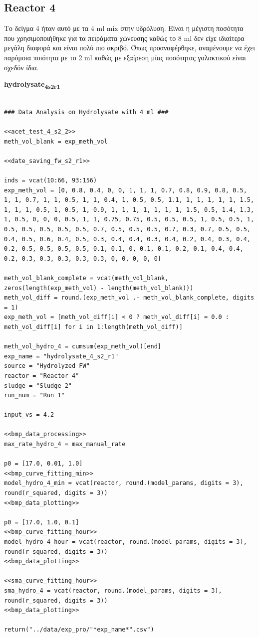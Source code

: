 \documentclass[11pt]{article}
\begin{document}
\subsection{Reactor 4}
\label{sec:org1684de5}
Το δείγμα 4 ήταν αυτό με τα 4 ml mix στην υδρόλυση. Είναι η μέγιστη ποσότητα που χρησιμοποιήθηκε για τα πειράματα χώνευσης καθώς το 8 ml δεν είχε ιδιαίτερα μεγάλη διαφορά και είναι πολύ πιο ακριβό. Όπως προαναφέρθηκε, αναμένουμε να έχει παρόμοια ποιότητα με το 2 ml καθώς με εξαίρεση μίας ποσότητας γαλακτικού είναι σχεδόν ίδια.

\textbf{hydrolysate\textsubscript{4}\textsubscript{s2}\textsubscript{r1}}
\begin{verbatim}

### Data Analysis on Hydrolysate with 4 ml ###

<<acet_test_4_s2_2>>
meth_vol_blank = exp_meth_vol

<<date_saving_fw_s2_r1>>

inds = vcat(10:66, 93:156)
exp_meth_vol = [0, 0.8, 0.4, 0, 0, 1, 1, 1, 0.7, 0.8, 0.9, 0.8, 0.5, 1, 1, 0.7, 1, 1, 0.5, 1, 1, 0.4, 1, 0.5, 0.5, 1.1, 1, 1, 1, 1, 1, 1.5, 1, 1, 1, 0.5, 1, 0.5, 1, 0.9, 1, 1, 1, 1, 1, 1, 1, 1.5, 0.5, 1.4, 1.3, 1, 0.5, 0, 0, 0, 0.5, 1, 1, 0.75, 0.75, 0.5, 0.5, 0.5, 1, 0.5, 0.5, 1, 0.5, 0.5, 0.5, 0.5, 0.5, 0.7, 0.5, 0.5, 0.5, 0.7, 0.3, 0.7, 0.5, 0.5, 0.4, 0.5, 0.6, 0.4, 0.5, 0.3, 0.4, 0.4, 0.3, 0.4, 0.2, 0.4, 0.3, 0.4, 0.2, 0.5, 0.5, 0.5, 0.5, 0.1, 0.1, 0, 0.1, 0.1, 0.2, 0.1, 0.4, 0.4, 0.2, 0.3, 0.3, 0.3, 0.3, 0.3, 0, 0, 0, 0, 0]

meth_vol_blank_complete = vcat(meth_vol_blank, zeros(length(exp_meth_vol) - length(meth_vol_blank)))
meth_vol_diff = round.(exp_meth_vol .- meth_vol_blank_complete, digits = 1)
exp_meth_vol = [meth_vol_diff[i] < 0 ? meth_vol_diff[i] = 0.0 : meth_vol_diff[i] for i in 1:length(meth_vol_diff)]

meth_vol_hydro_4 = cumsum(exp_meth_vol)[end]
exp_name = "hydrolysate_4_s2_r1"
source = "Hydrolyzed FW"
reactor = "Reactor 4"
sludge = "Sludge 2"
run_num = "Run 1"

input_vs = 4.2

<<bmp_data_processing>>
max_rate_hydro_4 = max_manual_rate

p0 = [17.0, 0.01, 1.0]
<<bmp_curve_fitting_min>>
model_hydro_4_min = vcat(reactor, round.(model_params, digits = 3), round(r_squared, digits = 3))
<<bmp_data_plotting>>

p0 = [17.0, 1.0, 0.1]
<<bmp_curve_fitting_hour>>
model_hydro_4_hour = vcat(reactor, round.(model_params, digits = 3), round(r_squared, digits = 3))
<<bmp_data_plotting>>

<<sma_curve_fitting_hour>>
sma_hydro_4 = vcat(reactor, round.(model_params, digits = 3), round(r_squared, digits = 3))
<<bmp_data_plotting>>

return("../data/exp_pro/"*exp_name*".csv")
\end{verbatim}
\end{document}

